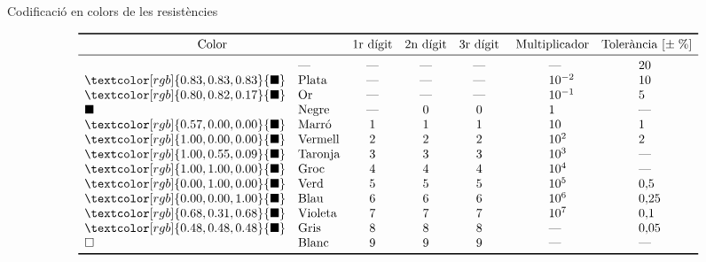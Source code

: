 \begin{table}[htb]
   \caption{Codificaci\'{o} en colors de les resist\`{e}ncies}
   \[ \begin{array}{llccc>{\hspace{3em}}l>{\hspace{3em}}l}
   \toprule[1pt]
   \multicolumn{2}{c}{\text{Color}} & \text{1r d\'{\i}git} & \text{2n d\'{\i}git} & \text{3r d\'{\i}git} & \multicolumn{1}{c}{\text{
   Multiplicador}} & \multicolumn{1}{c}{\text{Toler\`{a}ncia }[\pm\;\%]}
   \\
   \midrule
           &\text{---}     &  \text{---} &  \text{---} &  \text{---} &  \text{---} & 20 \\
   \textcolor[rgb]{0.83,0.83,0.83}{\blacksquare} &\text{Plata}   &  \text{---} &  \text{---} &  \text{---} &  10^{-2} & 10 \\
   \textcolor[rgb]{0.80,0.82,0.17}{\blacksquare} &\text{Or}      &  \text{---} &  \text{---} &  \text{---} &  10^{-1} & 5 \\
   \blacksquare &\text{Negre}   &  \text{---}   &  0   &  0   &  1   & \text{---} \\
   \textcolor[rgb]{0.57,0.00,0.00}{\blacksquare} &\text{Marr\'{o}}   &  1   &  1   &  1   &  10   & 1 \\
   \textcolor[rgb]{1.00,0.00,0.00}{\blacksquare} &\text{Vermell} &  2   &  2   &  2   &  10^2   & 2 \\
   \textcolor[rgb]{1.00,0.55,0.09}{\blacksquare} &\text{Taronja} &  3   &  3   &  3   &  10^3   & \text{---} \\
   \textcolor[rgb]{1.00,1.00,0.00}{\blacksquare} &\text{Groc}    &  4   &  4   &  4   &  10^4   & \text{---} \\
   \textcolor[rgb]{0.00,1.00,0.00}{\blacksquare} &\text{Verd}    &  5   &  5   &  5   &  10^5   & 0{,}5 \\
   \textcolor[rgb]{0.00,0.00,1.00}{\blacksquare} &\text{Blau}    &  6   &  6   &  6   &  10^6   & 0{,}25 \\
   \textcolor[rgb]{0.68,0.31,0.68}{\blacksquare} &\text{Violeta} &  7   &  7   &  7   &  10^7   & 0{,}1 \\
   \textcolor[rgb]{0.48,0.48,0.48}{\blacksquare} &\text{Gris}    &  8   &  8   &  8   &  \text{---}   & 0{,}05 \\
   \square &\text{Blanc}   &  9   &  9   &  9   &  \text{---}   & \text{---} \\
   \bottomrule[1pt]
   \end{array}   \]
\end{table}

